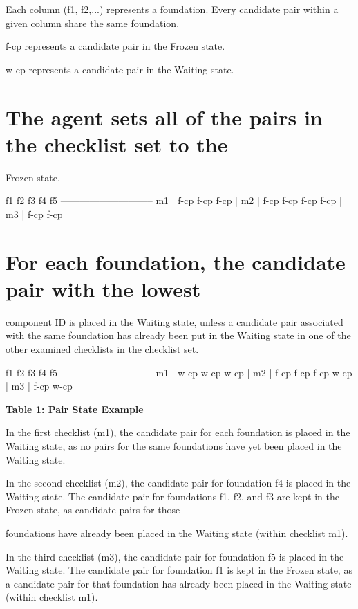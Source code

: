 \documentclass{article}
\begin{document}
Each column (f1, f2,...) represents a foundation.  Every candidate pair within a given column share the same foundation.

f-cp represents a candidate pair in the Frozen state.

w-cp represents a candidate pair in the Waiting state.

\section{The agent sets all of the pairs in the checklist set to the}

Frozen state.

f1    f2    f3    f4    f5 ----------------------------- m1 | f-cp  f-cp  f-cp | m2 | f-cp  f-cp  f-cp  f-cp | m3 | f-cp                    f-cp

\section{For each foundation, the candidate pair with the lowest}

component ID is placed in the Waiting state, unless a candidate pair associated with the same foundation has already been put in the Waiting state in one of the other examined checklists in the checklist set.

f1    f2    f3    f4    f5 ----------------------------- m1 | w-cp  w-cp  w-cp | m2 | f-cp  f-cp  f-cp  w-cp | m3 | f-cp                    w-cp

\begin{center}
\textbf{Table 1: Pair State Example}
\end{center}

In the first checklist (m1), the candidate pair for each foundation is placed in the Waiting state, as no pairs for the same foundations have yet been placed in the Waiting state.

In the second checklist (m2), the candidate pair for foundation f4 is placed in the Waiting state.  The candidate pair for foundations f1, f2, and f3 are kept in the Frozen state, as candidate pairs for those

foundations have already been placed in the Waiting state (within checklist m1).

In the third checklist (m3), the candidate pair for foundation f5 is placed in the Waiting state.  The candidate pair for foundation f1 is kept in the Frozen state, as a candidate pair for that foundation has already been placed in the Waiting state (within checklist m1).
\end{document}
